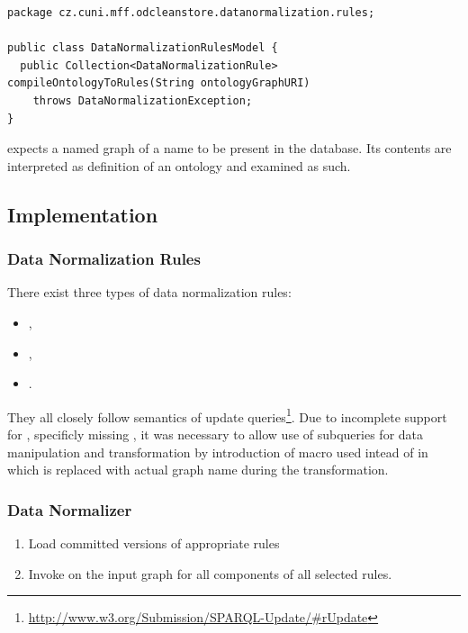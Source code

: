 \begin{lstlisting}[caption=Data Normalization Rule Generation,label=lst:dataNormalizationRulesModel]
package cz.cuni.mff.odcleanstore.datanormalization.rules;

public class DataNormalizationRulesModel {
  public Collection<DataNormalizationRule> compileOntologyToRules(String ontologyGraphURI)
    throws DataNormalizationException;
}
\end{lstlisting}

 expects a named graph of a name  to be present in the database. Its contents are interpreted as definition of an ontology and examined as such.

\subsection{Implementation}

\subsubsection*{Data Normalization Rules}

There exist three types of data normalization rules:

\begin{itemize}
	\item {},
	\item {},
	\item {}.
\end{itemize}

They all closely follow semantics of  update queries\footnote{\url{http://www.w3.org/Submission/SPARQL-Update/\#rUpdate}}. Due to incomplete support for , specificly missing , it was necessary to allow use of subqueries for data manipulation and transformation by introduction of  macro used intead of  in  which is replaced with actual graph name during the transformation.

\subsubsection*{Data Normalizer}

\begin{enumerate}
	\item Load committed versions of appropriate rules
	\item Invoke  on the input graph for all components of all selected rules.
\end{enumerate}

